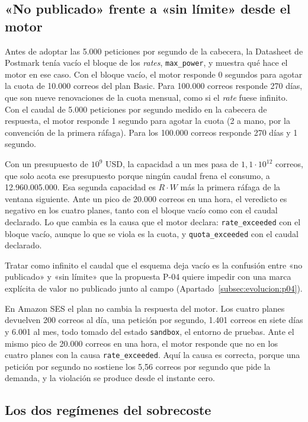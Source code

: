 \subsection{«No publicado» frente a «sin límite» desde el motor}

Antes de adoptar las 5.000 peticiones por segundo de la cabecera, la Datasheet de Postmark tenía vacío el bloque de los \textit{rates}, \texttt{max\_power}, y muestra qué hace el motor en ese caso.
Con el bloque vacío, el motor responde 0 segundos para agotar la cuota de 10.000 correos del plan Basic.
Para 100.000 correos responde 270 días, que son nueve renovaciones de la cuota mensual, como si el \textit{rate} fuese infinito.
Con el caudal de 5.000 peticiones por segundo medido en la cabecera de respuesta, el motor responde 1 segundo para agotar la cuota (2 a mano, por la convención de la primera ráfaga).
Para los 100.000 correos responde 270 días y 1 segundo.

Con un presupuesto de $10^{9}$ USD, la capacidad a un mes pasa de $1{,}1 \cdot 10^{12}$ correos, que solo acota ese presupuesto porque ningún caudal frena el consumo, a 12.960.005.000.
Esa segunda capacidad es $R \cdot W$ más la primera ráfaga de la ventana siguiente.
Ante un pico de 20.000 correos en una hora, el veredicto es negativo en los cuatro planes, tanto con el bloque vacío como con el caudal declarado.
Lo que cambia es la causa que el motor declara: \texttt{rate\_exceeded} con el bloque vacío, aunque lo que se viola es la cuota, y \texttt{quota\_exceeded} con el caudal declarado.

Tratar como infinito el caudal que el esquema deja vacío es la confusión entre «no publicado» y «sin límite» que la propuesta P-04 quiere impedir con una marca explícita de valor no publicado junto al campo (Apartado~\ref{subsec:evolucion:p04}).

En Amazon SES el plan no cambia la respuesta del motor.
Los cuatro planes devuelven 200 correos al día, una petición por segundo, 1.401 correos en siete días y 6.001 al mes, todo tomado del estado \texttt{sandbox}, el entorno de pruebas.
Ante el mismo pico de 20.000 correos en una hora, el motor responde que no en los cuatro planes con la causa \texttt{rate\_exceeded}.
Aquí la causa es correcta, porque una petición por segundo no sostiene los 5,56 correos por segundo que pide la demanda, y la violación se produce desde el instante cero.

\subsection{Los dos regímenes del sobrecoste}

